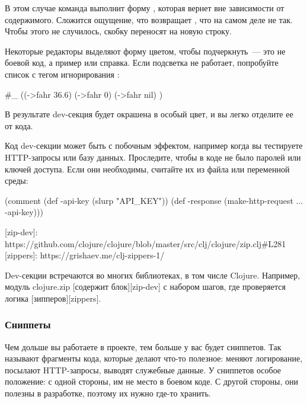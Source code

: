 В этом случае команда  выполнит форму , которая вернет  вне зависимости от содержимого. Сложится ощущение, что  возвращает , что на самом деле не так. Чтобы этого не случилось, скобку  переносят на новую строку.

Некоторые редакторы выделяют форму  цветом, чтобы подчеркнуть~--- это не боевой код, а пример или справка. Если подсветка не работает, попробуйте список с тегом игнорирования \code{\#\_}:

\begin{english}
  \begin{clojure}
#_
((->fahr 36.6)
  (->fahr 0)
  (->fahr nil)
)
  \end{clojure}
\end{english}

В результате dev-секция будет окрашена в особый цвет, и вы легко отделите ее от кода.

Код dev-секции может быть с побочным эффектом, например когда вы тестируете HTTP-запросы или базу данных. Проследите, чтобы в коде не было паролей или ключей доступа. Если они необходимы, считайте их из файла или переменной среды:

\begin{english}
  \begin{clojure}
(comment
  (def -api-key
    (slurp "API_KEY"))
  (def -response
    (make-http-request ... -api-key)))
  \end{clojure}
\end{english}

[zip-dev]: https://github.com/clojure/clojure/blob/master/src/clj/clojure/zip.clj\#L281
[zippers]: https://grishaev.me/clj-zippers-1/

Dev-секции встречаются во многих библиотеках, в том числе Clojure. Например, модуль clojure.zip [содержит блок][zip-dev]  с набором шагов, где проверяется логика [зипперов][zippers].

\subsubsection{Сниппеты}

Чем дольше вы работаете в проекте, тем больше у вас будет сниппетов. Так называют фрагменты кода, которые делают что-то полезное: меняют логирование, посылают HTTP-запросы, выводят служебные данные. У сниппетов особое положение: с одной стороны, им не место в боевом коде. С другой стороны, они полезны в разработке, поэтому их нужно где-то хранить.

